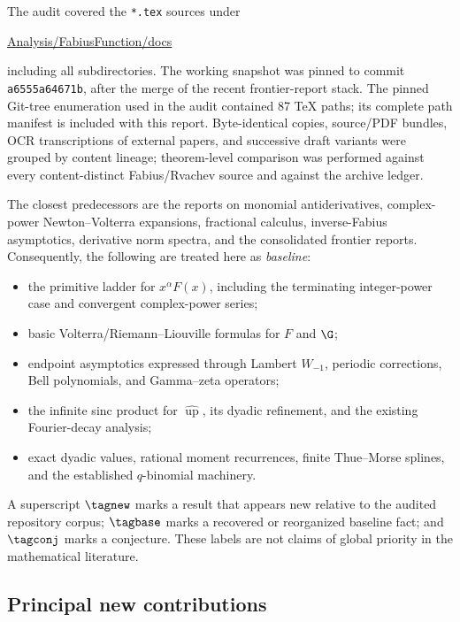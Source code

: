 \documentclass[11pt,oneside]{article}
\theoremstyle{definition}
\theoremstyle{remark}
\newcommand{\F}{F}
\newcommand{\Up}{\operatorname{up}}
\newcommand{\1}{\mathbf 1}
\begin{document}
The audit covered the \texttt{*.tex} sources under
\begin{center}
\url{Analysis/FabiusFunction/docs}
\end{center}
including all subdirectories.  The working snapshot was pinned to commit
\texttt{a6555a64671b}, after the merge of the recent
frontier-report stack.  The pinned Git-tree enumeration used in the audit contained 87 TeX paths;
its complete path manifest is included with this report.  Byte-identical copies, source/PDF bundles, OCR transcriptions of external papers,
and successive draft variants were grouped by content lineage; theorem-level
comparison was performed against every content-distinct Fabius/Rvachev source
and against the archive ledger.

The closest predecessors are the reports on monomial antiderivatives,
complex-power Newton--Volterra expansions, fractional calculus, inverse-Fabius
asymptotics, derivative norm spectra, and the consolidated frontier reports.
Consequently, the following are treated here as \emph{baseline}:
\begin{itemize}
  \item the primitive ladder for \(x^\alpha\F(x)\), including the terminating
        integer-power case and convergent complex-power series;
  \item basic Volterra/Riemann--Liouville formulas for \(\F\) and \(\G\);
  \item endpoint asymptotics expressed through Lambert \(W_{-1}\), periodic
        corrections, Bell polynomials, and Gamma--zeta operators;
  \item the infinite sinc product for \(\widehat{\Up}\), its dyadic refinement,
        and the existing Fourier-decay analysis;
  \item exact dyadic values, rational moment recurrences, finite Thue--Morse
        splines, and the established \(q\)-binomial machinery.
\end{itemize}

A superscript \(\tagnew\) marks a result that appears new relative to the audited
repository corpus; \(\tagbase\) marks a recovered or reorganized baseline fact;
and \(\tagconj\) marks a conjecture.  These labels are not claims of global
priority in the mathematical literature.

\subsection{Principal new contributions}
\end{document}
